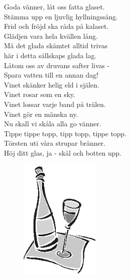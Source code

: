 \documentclass[a6paper, 10pt, twoside]{article}
\begin{document}
\noindent
\begin{center}
\end{center}
\begin{lyrics}
Goda vänner, låt oss fatta glaset.\\
Stämma upp en ljuvlig hyllningssång.\\
Frid och fröjd ska råda på kalaset.\\
Glädjen vara hela kvällen lång.
\vspace{5pt}\\
Må det glada skämtet alltid trivas\\
här i detta sällskaps glada lag.\\
Låtom oss av druvans safter livas -\\
Spara vatten till en annan dag!
\vspace{5pt}\\
Vinet skänker helig eld i själen.\\
Vinet rosar som en sky.\\
Vinet lossar varje band på trälen.\\
Vinet gör en mänska ny.
\vspace{5pt}\\
Nu skall vi skåla alla go vänner.\\
Tippe tippe topp, tipp topp, tippe topp.\\
Törsten uti våra strupar bränner.\\
Höj ditt glas, ja - skål och botten upp. 
\end{lyrics}
\begin{figure}[!h]
\hfill
\includegraphics[width=0.35\textwidth]{wine.png}
\end{figure}
\end{document}
